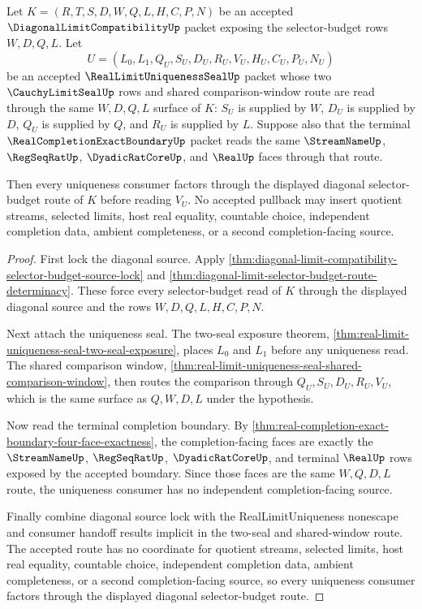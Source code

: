 \begin{theorem}
\label{thm:diagonal-limit-selector-budget-real-limit-uniqueness-pullback}
Let $K=(R,T,S,D,W,Q,L,H,C,P,N)$ be an accepted $\DiagonalLimitCompatibilityUp$ packet exposing the selector-budget rows $W,D,Q,L$. Let
$$
U=(L_0,L_1,Q_U,S_U,D_U,R_U,V_U,H_U,C_U,P_U,N_U)
$$
be an accepted $\RealLimitUniquenessSealUp$ packet whose two $\CauchyLimitSealUp$ rows and shared comparison-window route are read through the same $W,D,Q,L$ surface of $K$: $S_U$ is supplied by $W$, $D_U$ is supplied by $D$, $Q_U$ is supplied by $Q$, and $R_U$ is supplied by $L$. Suppose also that the terminal $\RealCompletionExactBoundaryUp$ packet reads the same $\StreamNameUp$, $\RegSeqRatUp$, $\DyadicRatCoreUp$, and $\RealUp$ faces through that route.

Then every uniqueness consumer factors through the displayed diagonal selector-budget route of $K$ before reading $V_U$. No accepted pullback may insert quotient streams, selected limits, host real equality, countable choice, independent completion data, ambient completeness, or a second completion-facing source.
\end{theorem}
\begin{proof}
First lock the diagonal source. Apply \autoref{thm:diagonal-limit-compatibility-selector-budget-source-lock} and \autoref{thm:diagonal-limit-selector-budget-route-determinacy}. These force every selector-budget read of $K$ through the displayed diagonal source and the rows $W,D,Q,L,H,C,P,N$.

Next attach the uniqueness seal. The two-seal exposure theorem, \autoref{thm:real-limit-uniqueness-seal-two-seal-exposure}, places $L_0$ and $L_1$ before any uniqueness read. The shared comparison window, \autoref{thm:real-limit-uniqueness-seal-shared-comparison-window}, then routes the comparison through $Q_U,S_U,D_U,R_U,V_U$, which is the same surface as $Q,W,D,L$ under the hypothesis.

Now read the terminal completion boundary. By \autoref{thm:real-completion-exact-boundary-four-face-exactness}, the completion-facing faces are exactly the $\StreamNameUp$, $\RegSeqRatUp$, $\DyadicRatCoreUp$, and terminal $\RealUp$ rows exposed by the accepted boundary. Since those faces are the same $W,Q,D,L$ route, the uniqueness consumer has no independent completion-facing source.

Finally combine diagonal source lock with the RealLimitUniqueness nonescape and consumer handoff results implicit in the two-seal and shared-window route. The accepted route has no coordinate for quotient streams, selected limits, host real equality, countable choice, independent completion data, ambient completeness, or a second completion-facing source, so every uniqueness consumer factors through the displayed diagonal selector-budget route.
\end{proof}

